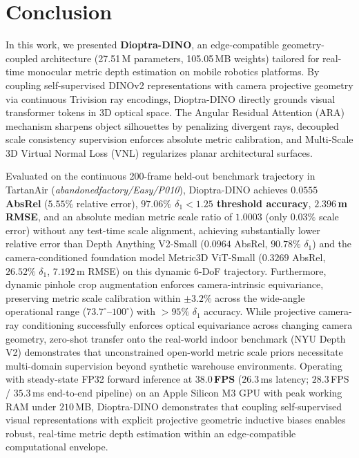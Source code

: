 \section{Conclusion}
\label{sec:conclusion}

In this work, we presented \textbf{Dioptra-DINO}, an edge-compatible geometry-coupled architecture (27.51\,M parameters, 105.05\,MB weights) tailored for real-time monocular metric depth estimation on mobile robotics platforms. By coupling self-supervised DINOv2 representations with camera projective geometry via continuous Trivision ray encodings, Dioptra-DINO directly grounds visual transformer tokens in 3D optical space. The Angular Residual Attention (ARA) mechanism sharpens object silhouettes by penalizing divergent rays, decoupled scale consistency supervision enforces absolute metric calibration, and Multi-Scale 3D Virtual Normal Loss (VNL) regularizes planar architectural surfaces.

Evaluated on the continuous 200-frame held-out benchmark trajectory in TartanAir (\textit{abandonedfactory\slash Easy\slash P010}), Dioptra-DINO achieves \textbf{$0.0555$ AbsRel} ($5.55\%$ relative error), \textbf{$97.06\%$ $\delta_1 < 1.25$ threshold accuracy}, \textbf{$2.396$\,m RMSE}, and an absolute median metric scale ratio of \textbf{$1.0003$} (only $0.03\%$ scale error) without any test-time scale alignment, achieving substantially lower relative error than Depth Anything V2-Small ($0.0964$ AbsRel, $90.78\%$ $\delta_1$) and the camera-conditioned foundation model Metric3D ViT-Small ($0.3269$ AbsRel, $26.52\%$ $\delta_1$, $7.192$\,m RMSE) on this dynamic 6-DoF trajectory. Furthermore, dynamic pinhole crop augmentation enforces camera-intrinsic equivariance, preserving metric scale calibration within $\pm 3.2\%$ across the wide-angle operational range ($73.7^\circ \text{--} 100^\circ$) with $>95\%$ $\delta_1$ accuracy. While projective camera-ray conditioning successfully enforces optical equivariance across changing camera geometry, zero-shot transfer onto the real-world indoor benchmark (NYU Depth V2) demonstrates that unconstrained open-world metric scale priors necessitate multi-domain supervision beyond synthetic warehouse environments. Operating with steady-state FP32 forward inference at \textbf{$38.0$\,FPS} ($26.3$\,ms latency; $28.3$\,FPS / $35.3$\,ms end-to-end pipeline) on an Apple Silicon M3 GPU with peak working RAM under $210$\,MB, Dioptra-DINO demonstrates that coupling self-supervised visual representations with explicit projective geometric inductive biases enables robust, real-time metric depth estimation within an edge-compatible computational envelope.
